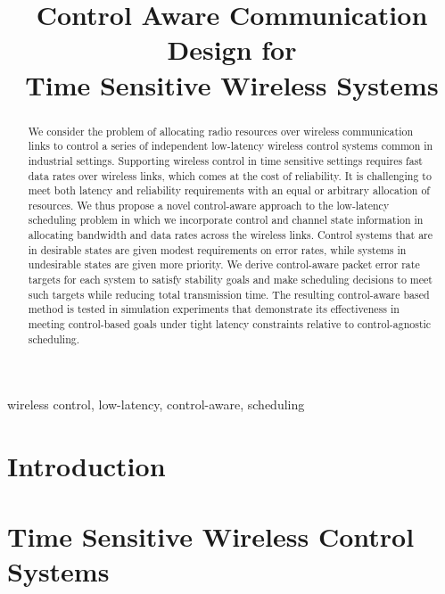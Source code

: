 \documentclass{article}
\title{Control Aware Communication Design for \\ Time Sensitive Wireless Systems}
\begin{document}
 
\maketitle
\ninept


%
\begin{abstract}
We consider the problem of allocating radio resources over wireless communication links to control a series of independent low-latency wireless control systems common in industrial settings. Supporting wireless control in time sensitive settings requires fast data rates over wireless links, which comes at the cost of reliability. It is challenging to meet both latency and reliability requirements with an equal or arbitrary allocation of resources. We thus propose a novel control-aware approach to the low-latency scheduling problem in which we incorporate control and channel state information in allocating bandwidth and data rates across the wireless links. Control systems that are in desirable states are given modest requirements on error rates, while systems in undesirable states are given more priority. We derive control-aware packet error rate targets for each system to satisfy stability goals and make scheduling decisions to meet such targets while reducing total transmission time. The resulting control-aware based method is tested in simulation experiments that demonstrate its effectiveness in meeting control-based goals under tight latency constraints relative to control-agnostic scheduling.
\end{abstract}
%

\begin{keywords}
wireless control, low-latency, control-aware, scheduling
\end{keywords}


\section{Introduction}


%

\section{Time Sensitive Wireless Control Systems}\label{sec_problem}



\end{document}
